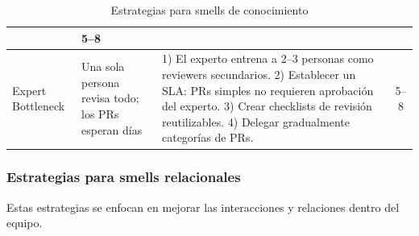 \begin{table}[h]
\begin{tabularx}{\textwidth}{|l|X|X|c|}
                       & 5--8                                                                                                                              \\
        \hline
        Expert Bottleneck
                       & Una sola persona revisa todo; los PRs esperan días
                       & 1) El experto entrena a 2–3 personas como reviewers secundarios.
        2) Establecer un SLA: PRs simples no requieren aprobación del experto.
        3) Crear checklists de revisión reutilizables.
        4) Delegar gradualmente categorías de PRs.
                       & 5--8                                                                                                                              \\
        \hline
    \end{tabularx}
    \caption{Estrategias para smells de conocimiento}
    \label{tab:estrategias-conocimiento}
\end{table}
\FloatBarrier

\subsubsection{Estrategias para smells relacionales}

Estas estrategias se enfocan en mejorar las interacciones y relaciones dentro del equipo.

